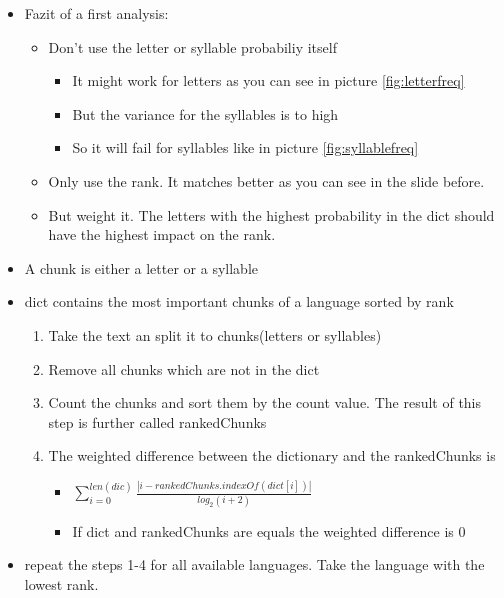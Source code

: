 \begin{frame}[c]
\begin{itemize}
  \item Fazit of a first analysis:
  \begin{itemize}
    \item Don't use the letter or syllable probabiliy itself
    \begin{itemize}
  		\item It might work for letters as you can see in picture \ref{fig:letterfreq}
  		\item But the variance for the syllables is to high
  		\item So it will fail for syllables like in picture \ref{fig:syllablefreq}
	\end{itemize}
    \item Only use the rank. It matches better as you can see in the slide
    before.
    \item But weight it. The letters with the highest probability in the dict
    should have the highest impact on the rank.
  \end{itemize}
\end{itemize}
\end{frame}


\begin{frame}[c]
\begin{itemize}
  \item A chunk is either a letter or a syllable
  \item dict contains the most important chunks of a language sorted by rank
\begin{enumerate}
  \item Take the text an split it to chunks(letters or syllables)
  \item Remove all chunks which are not in the dict
  \item Count the chunks and sort them by the count value. The result of this
  step is further called rankedChunks
  \item The weighted difference between the dictionary and the rankedChunks is
  \begin{itemize}
  \item $ \sum _{i=0}^{len(dic)} \frac{| i - rankedChunks.indexOf(dict[i]) |
  }{log _2 (i+2)}
  $
  \item If dict and rankedChunks are equals the weighted difference is 0
\end{itemize}
\end{enumerate}
\item repeat the steps 1-4 for all available languages. Take the language with
the lowest rank.
\end{itemize}
\end{frame}

